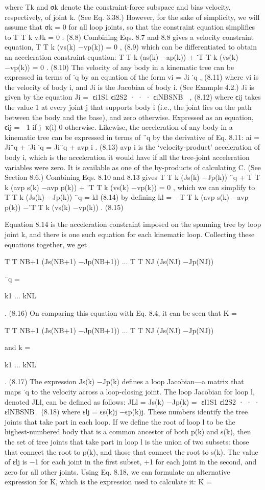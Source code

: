 where Tk and σk denote the constraint-force subspace and bias velocity, respectively, of joint k. (See Eq. 3.38.) However, for the sake of simplicity, we will assume that σk = 0 for all loop joints, so that the constraint equation simplifies to T T k vJk = 0 . (8.8) Combining Eqs. 8.7 and 8.8 gives a velocity constraint equation, T T k (vs(k) −vp(k)) = 0 , (8.9) which can be differentiated to obtain an acceleration constraint equation: T T k (as(k) −ap(k)) + ˙T T k (vs(k) −vp(k)) = 0 . (8.10) The velocity of any body in a kinematic tree can be expressed in terms of ˙q by an equation of the form vi = Ji ˙q , (8.11) where vi is the velocity of body i, and Ji is the Jacobian of body i. (See Example 4.2.) Ji is given by the equation Ji = ϵi1S1 ϵi2S2 · · · ϵiNBSNB  , (8.12) where ϵij takes the value 1 at every joint j that supports body i (i.e., the joint lies on the path between the body and the base), and zero otherwise. Expressed as an equation, ϵij =  1 if j ∈κ(i) 0 otherwise. Likewise, the acceleration of any body in a kinematic tree can be expressed in terms of ¨q by the derivative of Eq. 8.11: ai = Ji¨q + ˙Ji ˙q = Ji¨q + avp i . (8.13) avp i is the ‘velocity-product’ acceleration of body i, which is the acceleration it would have if all the tree-joint acceleration variables were zero. It is available as one of the by-products of calculating C. (See Section 8.6.) Combining Eqs. 8.10 and 8.13 gives T T k (Js(k) −Jp(k)) ¨q + T T k (avp s(k) −avp p(k)) + ˙T T k (vs(k) −vp(k)) = 0 , which we can simplify to T T k (Js(k) −Jp(k)) ¨q = kl (8.14) by defining kl = −T T k (avp s(k) −avp p(k)) −˙T T k (vs(k) −vp(k)) . (8.15)

Equation 8.14 is the acceleration constraint imposed on the spanning tree by loop joint k, and there is one such equation for each kinematic loop. Collecting these equations together, we get

T T NB+1 (Js(NB+1) −Jp(NB+1)) ... T T NJ (Js(NJ) −Jp(NJ))

¨q =

k1 ... kNL

. (8.16) On comparing this equation with Eq. 8.4, it can be seen that K =

T T NB+1 (Js(NB+1) −Jp(NB+1)) ... T T NJ (Js(NJ) −Jp(NJ))

and k =

k1 ... kNL

. (8.17) The expression Js(k) −Jp(k) defines a loop Jacobian—a matrix that maps ˙q to the velocity across a loop-closing joint. The loop Jacobian for loop l, denoted JLl, can be defined as follows: JLl = Js(k) −Jp(k) = εl1S1 εl2S2 · · · εlNBSNB  (8.18) where εlj = ϵs(k)j −ϵp(k)j. These numbers identify the tree joints that take part in each loop. If we define the root of loop l to be the highest-numbered body that is a common ancestor of both p(k) and s(k), then the set of tree joints that take part in loop l is the union of two subsets: those that connect the root to p(k), and those that connect the root to s(k). The value of εlj is −1 for each joint in the first subset, +1 for each joint in the second, and zero for all other joints. Using Eq. 8.18, we can formulate an alternative expression for K, which is the expression used to calculate it: K =

